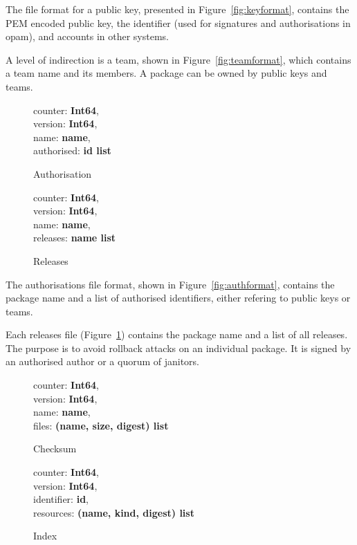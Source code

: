 \documentclass[nocopyrightspace]{sigplanconf}
\begin{document}
The file format for a public key, presented in Figure~\ref{fig:keyformat}, contains the PEM encoded public key, the identifier (used for signatures and authorisations in opam), and accounts in other systems.

A level of indirection is a team, shown in Figure~\ref{fig:teamformat}, which contains a team name and its members.  A package can be owned by public keys and teams.

\begin{figure}[h]
  \begin{minipage}{\hsize}
    \begin{minipage}{.4 \hsize}
counter: \textbf{Int64},\\
version: \textbf{Int64},\\
name: \textbf{name},\\
authorised: \textbf{id list}
 \caption{\label{fig:authformat} Authorisation}
    \end{minipage}
    \hspace*{.5cm}
    \begin{minipage}{.4 \hsize}
counter: \textbf{Int64},\\
version: \textbf{Int64},\\
name: \textbf{name},\\
releases: \textbf{name list}
 \caption{\label{fig:releasesformat} Releases}
    \end{minipage}
  \end{minipage}
\end{figure}

The authorisations file format, shown in Figure~\ref{fig:authformat}, contains the package name and a list of authorised identifiers, either refering to public keys or teams.

Each releases file (Figure~\ref{fig:releasesformat}) contains the package name and a list of all releases.
The purpose is to avoid rollback attacks on an individual package.
It is signed by an authorised author or a quorum of janitors.

\begin{figure}[h]
  \begin{minipage}{\hsize}
    \begin{minipage}{.4 \hsize}
counter: \textbf{Int64},\\
version: \textbf{Int64},\\
name: \textbf{name},\\
files: \textbf{(name, size, digest) list}
 \caption{\label{fig:checksumformat} Checksum}
    \end{minipage}
    \hspace*{.5cm}
    \begin{minipage}{.4 \hsize}
counter: \textbf{Int64},\\
version: \textbf{Int64},\\
identifier: \textbf{id},\\
resources: \textbf{(name, kind, digest) list}
 \caption{\label{fig:janindexformat} Index}
    \end{minipage}
  \end{minipage}
\end{figure}
\end{document}
